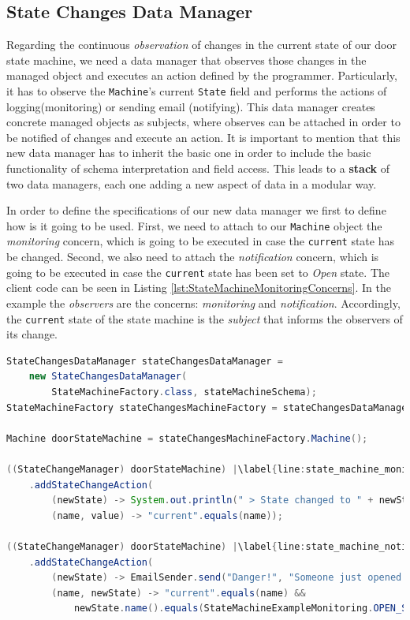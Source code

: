 \subsection{State Changes Data Manager}
Regarding the continuous \textit{observation} of changes in the current state of our door state machine, we need a data manager that observes those changes in the managed object and executes an action defined by the programmer.
Particularly, it has to observe the \texttt{Machine}'s current \texttt{State} field and performs the actions of logging(monitoring) or sending email (notifying).
This data manager creates concrete managed objects as subjects, where observes can be attached in order to be notified of changes and execute an action.
It is important to mention that this new data manager has to inherit the basic one in order to include the basic functionality of schema interpretation and field access.
This leads to a \textbf{stack} of two data managers, each one adding a new aspect of data in a modular way.

In order to define the specifications of our new data manager we first to define how is it going to be used.
First, we need to attach to our \texttt{Machine} object the \textit{monitoring} concern, which is going to be executed in case the \texttt{current} state has be changed.
Second, we also need to attach the \textit{notification} concern, which is going to be executed in case the \texttt{current} state has been set to \textit{Open} state.
The client code can be seen in Listing \ref{lst:StateMachineMonitoringConcerns}.
In the example the \textit{observers} are the concerns: \textit{monitoring} and \textit{notification}. 
Accordingly, the \texttt{current} state of the state machine is the \textit{subject} that informs the observers of its change.

\begin{sourcecode} [H]
	\begin{lstlisting}[language=Java, escapechar=|]
StateChangesDataManager stateChangesDataManager =
	new StateChangesDataManager(
		StateMachineFactory.class, stateMachineSchema);
StateMachineFactory stateChangesMachineFactory = stateChangesDataManager.make();

Machine doorStateMachine = stateChangesMachineFactory.Machine();

((StateChangeManager) doorStateMachine) |\label{line:state_machine_monitor}|
	.addStateChangeAction(
		(newState) -> System.out.println(" > State changed to " + newState.name()),
		(name, value) -> "current".equals(name));

((StateChangeManager) doorStateMachine) |\label{line:state_machine_notify}|
	.addStateChangeAction(
		(newState) -> EmailSender.send("Danger!", "Someone just opened the door!"),
		(name, newState) -> "current".equals(name) &&
			newState.name().equals(StateMachineExampleMonitoring.OPEN_STATE));
	\end{lstlisting}
	\caption{Door state machine with concerns}
	\label{lst:StateMachineMonitoringConcerns}
\end{sourcecode}

